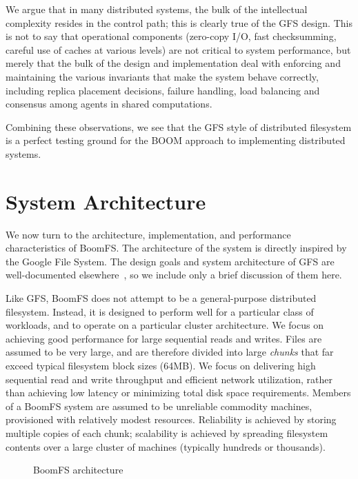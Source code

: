 \documentclass[twocolumn]{article}
\begin{document}
We argue that in many distributed systems, the bulk of the
intellectual complexity resides in the control path; this is clearly
true of the GFS design. This is not to say that operational components
(zero-copy I/O, fast checksumming, careful use of caches at various
levels) are not critical to system performance, but merely that the
bulk of the design and implementation deal with enforcing and
maintaining the various invariants that make the system behave
correctly, including replica placement decisions, failure handling,
load balancing and consensus among agents in shared computations.

Combining these observations, we see that the GFS style of distributed
filesystem is a perfect testing ground for the BOOM approach to
implementing distributed systems.

\section{System Architecture}
\label{system-arch}
We now turn to the architecture, implementation, and performance
characteristics of BoomFS. The architecture of the system is directly
inspired by the Google File System. The design goals and system
architecture of GFS are well-documented elsewhere~\cite{gfs,
  hdfs-arch}, so we include only a brief discussion of them here.

Like GFS, BoomFS does not attempt to be a general-purpose distributed
filesystem. Instead, it is designed to perform well for a particular
class of workloads, and to operate on a particular cluster
architecture. We focus on achieving good performance for large
sequential reads and writes. Files are assumed to be very large, and
are therefore divided into large \emph{chunks} that far exceed typical
filesystem block sizes (64MB). We focus on
delivering high sequential read and write throughput and efficient
network utilization, rather than achieving low latency or minimizing
total disk space requirements. Members of a BoomFS system are assumed
to be unreliable commodity machines, provisioned with relatively
modest resources.  Reliability is achieved by storing multiple copies
of each chunk; scalability is achieved by spreading filesystem
contents over a large cluster of machines (typically hundreds or
thousands).

\begin{figure}
\centering
{}
\caption{BoomFS architecture}
\label{fig:system-arch}
\end{figure}
\end{document}
